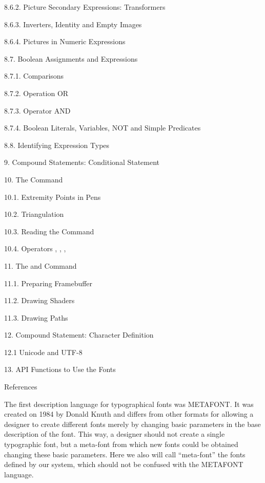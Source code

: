 8.6.2. Picture Secondary Expressions: Transformers 

8.6.3. Inverters, Identity and Empty Images 

8.6.4. Pictures in Numeric Expressions 

8.7. Boolean Assignments and Expressions 

8.7.1. Comparisons 

8.7.2. Operation OR 

8.7.3. Operator AND 

8.7.4. Boolean Literals, Variables, NOT and Simple Predicates 

8.8. Identifying Expression Types 

9. Compound Statements: Conditional Statement 

10. The  Command 

10.1. Extremity Points in Pens 

10.2. Triangulation 

10.3. Reading the  Command

10.4. Operators , , ,

11. The  and  Command

11.1. Preparing Framebuffer 

11.2. Drawing Shaders

11.3. Drawing Paths 

12. Compound Statement: Character Definition 

12.1 Unicode and UTF-8 

13. API Functions to Use the Fonts 

References 



The first description language for typographical fonts was
METAFONT. It was created on 1984 by Donald Knuth and differs from
other formats for allowing a designer to create different fonts merely
by changing basic parameters in the base description of the font. This
way, a designer should not create a single typographic font, but a
meta-font from which new fonts could be obtained changing these basic
parameters. Here we also will call ``meta-font'' the fonts defined by
our system, which should not be confused with the METAFONT language.

